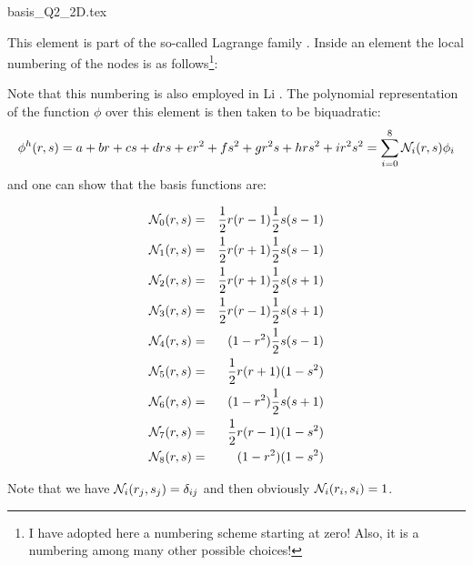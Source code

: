 \begin{flushright} {\tiny {\color{gray} basis\_Q2\_2D.tex}} \end{flushright}

This element is part of the so-called Lagrange family \cite{raki00}. 
Inside an element the local numbering of the nodes is as follows\footnote{I have adopted here 
a numbering scheme starting at zero! Also, it is a numbering among many other possible choices!}:



Note that this numbering is also employed in Li \cite[p56]{li06}.
The polynomial representation of the function $\phi$ over this element is then taken to be biquadratic:
\[
\phi^h(r,s) = a + br + cs + drs + er^2 + fs^2 + gr^2s + hrs^2 + i r^2s^2 = \sum_{i=0}^8 {\mathcal{N}}_i(r,s) \phi_i
\]
and one can show that the basis functions are:
\begin{mdframed}[backgroundcolor=blue!5]
\begin{eqnarray}
{\mathcal{N}}_0(r,s)&=& \frac{1}{2}r(r-1)  \frac{1}{2}s(s-1)\nonumber\\
{\mathcal{N}}_1(r,s)&=& \frac{1}{2}r(r+1)  \frac{1}{2}s(s-1)\nonumber\\
{\mathcal{N}}_2(r,s)&=& \frac{1}{2}r(r+1)  \frac{1}{2}s(s+1)\nonumber\\
{\mathcal{N}}_3(r,s)&=& \frac{1}{2}r(r-1)  \frac{1}{2}s(s+1)\nonumber\\
{\mathcal{N}}_4(r,s)&=&     (1-r^2)  \frac{1}{2}s(s-1)\nonumber\\
{\mathcal{N}}_5(r,s)&=& \frac{1}{2}r(r+1)      (1-s^2)\nonumber\\
{\mathcal{N}}_6(r,s)&=&     (1-r^2)  \frac{1}{2}s(s+1)\nonumber\\
{\mathcal{N}}_7(r,s)&=& \frac{1}{2}r(r-1)      (1-s^2)\nonumber\\
{\mathcal{N}}_8(r,s)&=&     (1-r^2)      (1-s^2)\nonumber
\end{eqnarray}
\end{mdframed}
Note that we have ${\mathcal{N}}_i(r_j,s_j)=\delta_{ij}$ and then obviously ${\mathcal{N}}_i(r_i,s_i)=1$. 

